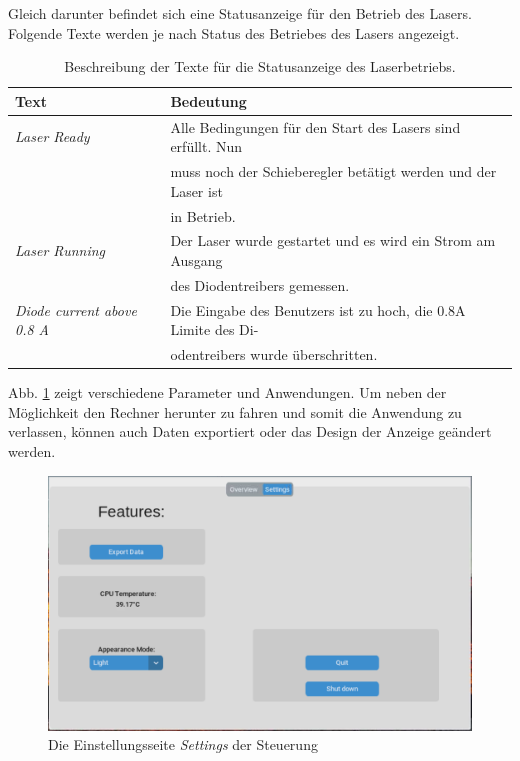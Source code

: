 Gleich darunter befindet sich eine Statusanzeige für den Betrieb des Lasers. Folgende Texte werden je nach Status des Betriebes des Lasers angezeigt.

\begin{table}[H]
    \centering
    \begin{tabular}{l|l}
        \textbf{Text}&                          \textbf{Bedeutung}\\
        \hline
         \textit{Laser Ready}&                  Alle Bedingungen für den Start des Lasers sind erfüllt. Nun\\
         &                                      muss noch der Schieberegler betätigt werden und der Laser ist\\
         &                                      in Betrieb.\\
         \textit{Laser Running}&                Der Laser wurde gestartet und es wird ein Strom am Ausgang\\
         &                                      des Diodentreibers gemessen.\\
         \textit{Diode current above 0.8 A}&    Die Eingabe des Benutzers ist zu hoch, die 0.8A Limite des Di-\\
         &                                      odentreibers wurde überschritten.                                
    \end{tabular}
    \caption{Beschreibung der Texte für die Statusanzeige des Laserbetriebs.}
    \label{tab:my_label}
\end{table}

Abb. \ref{fig:settings_sw} zeigt verschiedene Parameter und Anwendungen. Um neben der Möglichkeit den Rechner herunter zu fahren und somit die Anwendung zu verlassen, können auch Daten exportiert oder das Design der Anzeige geändert werden.

\begin{figure}[H]
    \centering
    \includegraphics[scale=0.3, trim={1mm 1mm 1mm 2mm}, clip]{98_images/window_settings_large_02.PNG}
    \caption{Die Einstellungsseite \textit{Settings} der Steuerung}
    \label{fig:settings_sw}
\end{figure}

